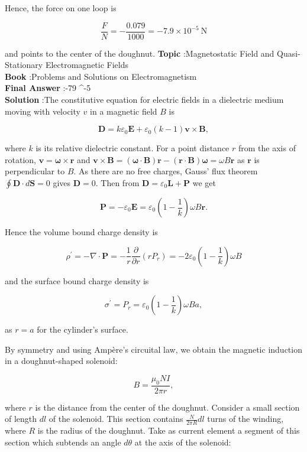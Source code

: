 \documentclass[10pt]{article}
\begin{document}
Hence, the force on one loop is

$$
\frac{F}{N}=-\frac{0.079}{1000}=-7.9 \times 10^{-5} \mathrm{~N}
$$

and points to the center of the doughnut.
\textbf{Topic} :Magnetostatic Field and Quasi-Stationary Electromagnetic Fields\\
\textbf{Book} :Problems and Solutions on Electromagnetism\\
\textbf{Final Answer} :-79 ^{-5} \\


\textbf{Solution} :The constitutive equation for electric fields in a dielectric medium moving with velocity $v$ in a magnetic field $B$ is

$$
\mathbf{D}=k \varepsilon_{0} \mathbf{E}+\varepsilon_{0}(k-1) \mathbf{v} \times \mathbf{B},
$$

where $k$ is its relative dielectric constant. For a point distance $r$ from the axis of rotation, $\mathbf{v}=\boldsymbol{\omega} \times \mathbf{r}$ and $\mathbf{v} \times \mathbf{B}=(\boldsymbol{\omega} \cdot \mathbf{B}) \mathbf{r}-(\mathbf{r} \cdot \mathbf{B}) \boldsymbol{\omega}=\omega B \mathbf{r}$ as $\mathbf{r}$ is perpendicular to $B$. As there are no free charges, Gauss' flux theorem $\oint \mathbf{D} \cdot d \mathbf{S}=0$ gives $\mathbf{D}=0$. Then from $\mathbf{D}=\varepsilon_{0} \mathbf{L}+\mathbf{P}$ we get

$$
\mathbf{P}=-\varepsilon_{0} \mathbf{E}=\varepsilon_{0}\left(1-\frac{1}{k}\right) \omega B \mathbf{r} .
$$

Hence the volume bound charge density is

$$
\rho^{\prime}=-\nabla \cdot \mathbf{P}=-\frac{1}{r} \frac{\partial}{\partial r}\left(r P_{r}\right)=-2 \varepsilon_{0}\left(1-\frac{1}{k}\right) \omega B
$$

and the surface bound charge density is

$$
\sigma^{\prime}=P_{r}=\varepsilon_{0}\left(1-\frac{1}{k}\right) \omega B a,
$$

as $r=a$ for the cylinder's surface.

 By symmetry and using Ampère's circuital law, we obtain the magnetic induction in a doughnut-shaped solenoid:

$$
B=\frac{\mu_{0} N I}{2 \pi r},
$$

where $r$ is the distance from the center of the doughnut. Consider a small section of length $d l$ of the solenoid. This section contains $\frac{N}{2 \pi R} d l$ turns of the winding, where $R$ is the radius of the doughnut. Take as current element a segment of this section which subtends an angle $d \theta$ at the axis of the solenoid:
\end{document}
